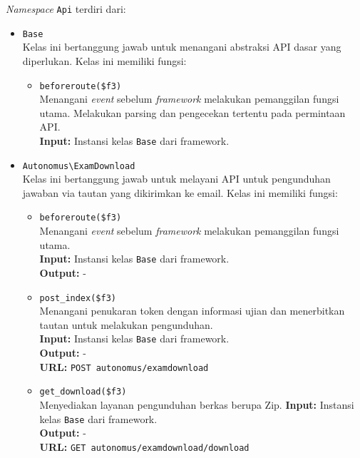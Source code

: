     \textit{Namespace} \texttt{Api} terdiri dari:
    \begin{itemize}
        \item \texttt{Base} \\
            Kelas ini bertanggung jawab untuk menangani abstraksi API dasar yang
            diperlukan. Kelas ini memiliki fungsi:
            \begin{itemize}
                \item \texttt{beforeroute(\$f3)} \\
                    Menangani \textit{event} sebelum \textit{framework}
                    melakukan pemanggilan fungsi utama. Melakukan parsing dan
                    pengecekan tertentu pada permintaan API.\\
                    \textbf{Input:} Instansi kelas \texttt{Base} dari framework.
            \end{itemize}
    
        \item \texttt{Autonomus\textbackslash ExamDownload} \\
            Kelas ini bertanggung jawab untuk melayani API untuk pengunduhan
            jawaban via tautan yang dikirimkan ke email. Kelas ini memiliki
            fungsi:
            \begin{itemize}
                \item \texttt{beforeroute(\$f3)} \\
                    Menangani \textit{event} sebelum \textit{framework}
                    melakukan pemanggilan fungsi utama.\\
                    \textbf{Input:} Instansi kelas \texttt{Base} dari
                    framework.\\
                    \textbf{Output:} -
                
                \item \texttt{post\_index(\$f3)} \\
                    Menangani penukaran token dengan informasi ujian dan
                    menerbitkan tautan untuk melakukan pengunduhan.\\
                    \textbf{Input:} Instansi kelas \texttt{Base} dari
                    framework.\\
                    \textbf{Output:} - \\
                    \textbf{URL:} \texttt{POST autonomus/examdownload}
                
                \item \texttt{get\_download(\$f3)} \\
                    Menyediakan layanan pengunduhan berkas berupa Zip.
                    \textbf{Input:} Instansi kelas \texttt{Base} dari
                    framework.\\
                    \textbf{Output:} -\\
                    \textbf{URL:} \texttt{GET autonomus/examdownload/download}
            \end{itemize}
            

\end{itemize}
